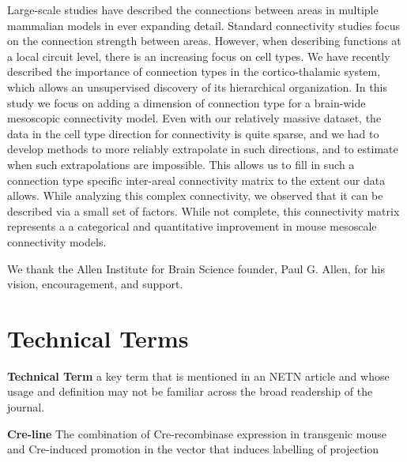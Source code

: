 \documentclass[NETN,manuscript]{stjour-new}
\begin{document}
\begin{authorsummary}
Large-scale studies have described the connections between areas in multiple mammalian models in ever expanding detail.
Standard connectivity studies focus on the connection strength between areas.
However, when describing functions at a local circuit level, there is an increasing focus on cell types.
We have recently described the importance of connection types in the cortico-thalamic system, which allows an unsupervised discovery of its hierarchical organization.
In this study we focus on adding a dimension of connection type for a brain-wide mesoscopic connectivity model.
Even with our relatively massive dataset, the data in the cell type direction for connectivity is quite sparse, and we had to develop methods to more reliably extrapolate in such directions, and to estimate when such extrapolations are impossible.
This allows us to fill in such a connection type specific inter-areal connectivity matrix to the extent our data allows. 
While analyzing this complex connectivity, we observed that it can be described via a small set of factors. 
While not complete, this connectivity matrix represents a a categorical and quantitative improvement in mouse mesoscale connectivity models. 

\end{authorsummary}

\newpage


\newpage

\newpage

\newpage


\newpage

\acknowledgments
We thank the Allen Institute for Brain Science founder, Paul G. Allen, for his vision, encouragement, and support.
\newpage


\newpage


\newpage
\section{Technical Terms}

\textbf{Technical Term} a key term that is mentioned in an NETN article and whose usage and definition may not be familiar across the broad readership of the journal. 

\textbf{Cre-line}  The combination of Cre-recombinase expression in transgenic mouse and Cre-induced promotion in the vector that induces labelling of projection
\end{document}
